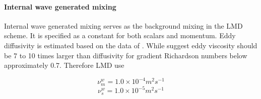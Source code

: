 \paragraph{Internal wave generated mixing}
Internal wave generated mixing serves as the background mixing in the
LMD scheme.  It is specified as a constant for both scalars and
momentum.  Eddy diffusivity is estimated based on the data of
\citet{LWL93}.  While \citet{Peters88} suggest
eddy viscosity should be 7 to 10 times larger than diffusivity for
gradient Richardson numbers below approximately 0.7.  Therefore LMD use

\begin{equation}
\nu_{m}^w=1.0 \times 10^{-4} m^2 s^{-1}
\end{equation}
\begin{equation}
\nu_{s}^w=1.0 \times 10^{-5} m^2 s^{-1}
\end{equation}

